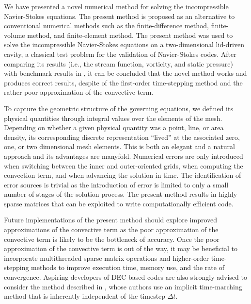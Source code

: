 We have presented a novel numerical method for solving the incompressible Navier-Stokes equations. The present method is proposed as an alternative to conventional numerical methods such as the finite-difference method, finite-volume method, and finite-element method. The present method was used to solve the incompressible Navier-Stokes equations on a two-dimensional lid-driven cavity, a classical test problem for the validation of Navier-Stokes codes. After comparing its results (i.e., the stream function, vorticity, and static pressure) with benchmark results in \parencite{botella1998benchmark}, it can be concluded that the novel method works and produces correct results, despite of the first-order time-stepping method and the rather poor approximation of the convective term.

To capture the geometric structure of the governing equations, we defined its physical quantities through integral values over the elements of the mesh. Depending on whether a given physical quantity was a point, line, or area density, its corresponding discrete representation “lived” at the associated zero, one, or two dimensional mesh elements. This is both an elegant and a natural approach and its advantages are manyfold. Numerical errors are only introduced when switching between the inner and outer-oriented grids, when computing the convection term, and when advancing the solution in time. The identification of error sources is trivial as the introduction of error is limited to only a small number of stages of the solution process. The present method results in highly sparse matrices that can be exploited to write computationally efficient code.

Future implementations of the present method should explore improved approximations of the convective term as the poor approximation of the convective term is likely to be the bottleneck of accuracy. Once the poor approximation of the convective term is out of the way, it may be beneficial to incorporate multithreaded sparse matrix operations and higher-order time-stepping methods to improve execution time, memory use, and the rate of convergence. Aspiring developers of DEC based codes are also strongly advised to consider the method described in \parencite{elcott2005discrete}, whose authors use an implicit time-marching method that is inherently independent of the timestep $\Delta t$.